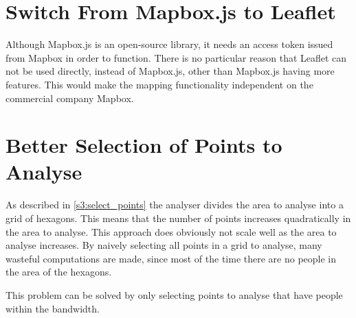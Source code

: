 \section{Switch From Mapbox.js to Leaflet}
Although Mapbox.js is an open-source library, it needs an access token issued from Mapbox in order to function. There is no particular reason that Leaflet can not be used directly, instead of Mapbox.js, other than Mapbox.js having more features. This would make the mapping functionality independent on the commercial company Mapbox.

\section{Better Selection of Points to Analyse}
As described in \cref{s3:select_points} the analyser divides the area to analyse into a grid of hexagons. This means that the number of points increases quadratically in the area to analyse.  This approach does obviously not scale well as the area to analyse increases. By naively selecting all points in a grid to analyse, many wasteful computations are made, since most of the time there are no people in the area of the hexagons.

This problem can be solved by only selecting points to analyse that have people within the bandwidth.